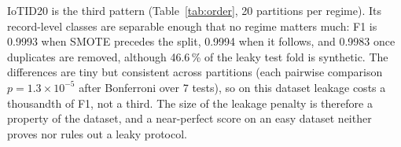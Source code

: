 IoTID20 is the third pattern (Table~\ref{tab:order}, 20 partitions per regime). Its record-level classes are separable enough that no regime matters much: F1 is 0.9993 when SMOTE precedes the split, 0.9994 when it follows, and 0.9983 once duplicates are removed, although 46.6\,\% of the leaky test fold is synthetic. The differences are tiny but consistent across partitions (each pairwise comparison $p = 1.3\times10^{-5}$ after Bonferroni over 7 tests), so on this dataset leakage costs a thousandth of F1, not a third. The size of the leakage penalty is therefore a property of the dataset, and a near-perfect score on an easy dataset neither proves nor rules out a leaky protocol.
